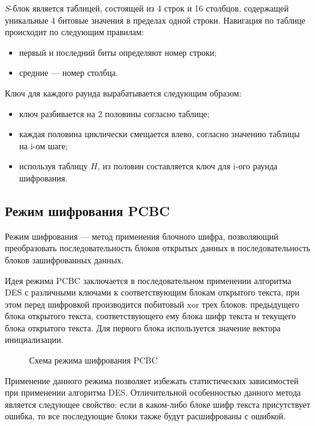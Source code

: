$S$-блок является таблицей, состоящей из 4 строк и 16 столбцов, 
содержащей уникальные 4 битовые значения в пределах одной строки. Навигация по
таблице происходит по следующим правилам:
\begin{itemize}
    \item первый и последний биты определяют номер строки;
    \item средние --- номер столбца.
\end{itemize}

Ключ для каждого раунда вырабатывается следующим образом:
\begin{itemize}
    \item ключ разбивается на 2 половины согласно таблице;
    \item каждая половина циклически смещается влево, согласно значению
          таблицы на i-ом шаге;
    \item используя таблицу $H$, из половин составляется ключ для i-ого раунда
          шифрования.
\end{itemize}

\subsection{Режим шифрования PCBC}
Режим шифрования --- метод применения блочного шифра, позволяющий преобразовать
последовательность блоков открытых данных в последовательность блоков
зашифрованных данных.

Идея режима PCBC заключается в последовательном применении алгоритма
DES с различными ключами к соответствующим блокам открытого текста, при этом
перед шифровкой производится побитовый $\mathrm{xor}$ трех блоков:
предыдущего блока открытого текста, соответствующего ему блока шифр текста
и текущего блока открытого текста. Для первого блока используется значение
вектора инициализации.

\clearpage

\begin{figure}[h]
    \centering
    \def\svgwidth{\textwidth}
    
    \caption{Схема режима шифрования PCBC}
    \label{fig:pcbc}
\end{figure}

Применение данного режима позволяет избежать статистических зависимостей
при применении алгоритма DES. Отличительной особенностью данного
метода является следующее свойство: если в каком-либо блоке шифр текста
присутствует ошибка, то все последующие блоки также будут расшифрованы
с ошибкой.

